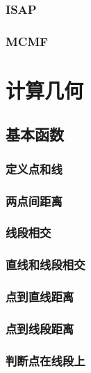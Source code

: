 \documentclass[twocolumn,a4]{article}%
\begin{document}
    \subsubsection{ISAP}
    
    \subsubsection{MCMF}
    
\section{计算几何}
\subsection{基本函数}
    \subsubsection{定义点和线}
    
    \subsubsection{两点间距离}
    
    \subsubsection{线段相交}
    
    \subsubsection{直线和线段相交}
    
    \subsubsection{点到直线距离}
    
    \subsubsection{点到线段距离}
    
    \subsubsection{判断点在线段上}
    
\end{document}
